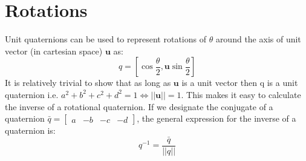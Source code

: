 \documentclass{article}
\begin{document}
\section*{Rotations}
Unit quaternions can be used to represent rotations of $\theta$ around the axis of unit vector (in cartesian space) $\mathbf{u}$ as: $$ q = \left[ \cos{\frac{\theta}{2}} , \mathbf{u} \sin{\frac{\theta}{2}}\right]$$
It is relatively trivial to show that as long as $\mathbf{u}$ is a unit vector then q is a unit quaternion i.e. $a^2 + b^2 + c^2 +d^2 = 1 \iff ||\mathbf{u}|| = 1$. This makes it easy to calculate the inverse of a rotational quaternion. If we designate the conjugate of a quaternion $\bar{q} = \begin{bmatrix}a & -b & -c & -d \end{bmatrix}$, the general expression for the inverse of a quaternion is:
$$q^{-1} = \frac{\bar{q}}{||q||} $$
\end{document}
